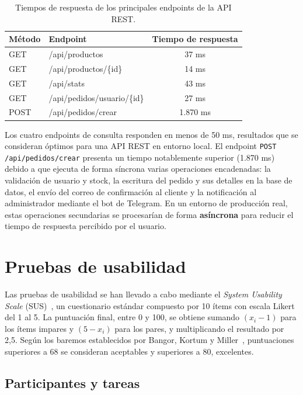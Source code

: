 \begin{table}[H]
\centering
\small
\begin{tabular}{|l|l|c|}
\hline
\textbf{Método} & \textbf{Endpoint} & \textbf{Tiempo de respuesta} \\
\hline
GET  & /api/productos              & 37 ms \\
\hline
GET  & /api/productos/\{id\}       & 14 ms \\
\hline
GET  & /api/stats                  & 43 ms \\
\hline
GET  & /api/pedidos/usuario/\{id\} & 27 ms \\
\hline
POST & /api/pedidos/crear          & 1.870 ms \\
\hline
\end{tabular}
\caption{Tiempos de respuesta de los principales endpoints de la API REST.}
\end{table}

Los cuatro endpoints de consulta responden en menos de 50 ms, resultados que se consideran óptimos para una API REST en entorno local. El endpoint \texttt{POST /api/pedidos/crear} presenta un tiempo notablemente superior (1.870 ms) debido a que ejecuta de forma síncrona varias operaciones encadenadas: la validación de usuario y stock, la escritura del pedido y sus detalles en la base de datos, el envío del correo de confirmación al cliente y la notificación al administrador mediante el bot de Telegram. En un entorno de producción real, estas operaciones secundarias se procesarían de forma \textbf{asíncrona} para reducir el tiempo de respuesta percibido por el usuario.


\section{Pruebas de usabilidad}

Las pruebas de usabilidad se han llevado a cabo mediante el \textit{System Usability Scale} (SUS)~\cite{Brooke1996}, un cuestionario estándar compuesto por 10 ítems con escala Likert del 1 al 5. La puntuación final, entre 0 y 100, se obtiene sumando \((x_i - 1)\) para los ítems impares y \((5 - x_i)\) para los pares, y multiplicando el resultado por 2,5. Según los baremos establecidos por Bangor, Kortum y Miller~\cite{Bangor2008}, puntuaciones superiores a 68 se consideran aceptables y superiores a 80, excelentes.

\subsection{Participantes y tareas}


